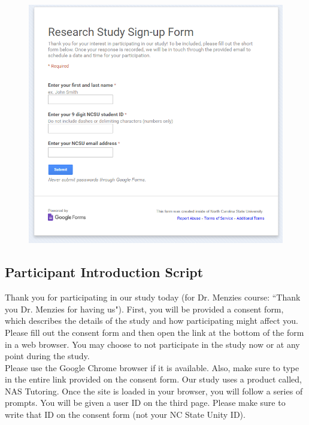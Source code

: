 \documentclass{sig-alternate-05-2015}
\begin{document}
{\begin{figure}[!h]
    \centering
    \includegraphics[width=\linewidth]{appendix/signup_form.png}
\end{figure}

\subsection{Participant Introduction Script}

\noindent Thank you for participating in our study today (for Dr. Menzies course: ``Thank you Dr. Menzies for having us"). First, you will be provided a consent form, which describes the details of the study and how participating might affect you. Please fill out the consent form and then open the link at the bottom of the form in a web browser. You may choose to not participate in the study now or at any point during the study.\\

\noindent Please use the Google Chrome browser if it is available. Also, make sure to type in the entire link provided on the consent form. Our study uses a product called, NAS Tutoring. Once the site is loaded in your browser, you will follow a series of prompts. You will be given a user ID on the third page. Please make sure to write that ID on the consent form (not your NC State Unity ID).\\

}
\end{document}
